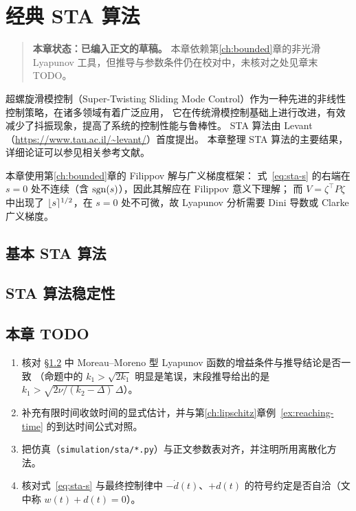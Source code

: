 \chapter{经典 STA 算法}\label{ch:sta}

\begin{quote}
\textbf{本章状态：已编入正文的草稿。}
本章依赖第\ref{ch:bounded}章的非光滑 Lyapunov 工具，但推导与参数条件仍在校对中，未核对之处见章末 TODO。
\end{quote}

超螺旋滑模控制（Super-Twisting Sliding Mode Control）作为一种先进的非线性控制策略，在诸多领域有着广泛应用，
它在传统滑模控制基础上进行改进，有效减少了抖振现象，提高了系统的控制性能与鲁棒性。
STA 算法由 Levant（\url{https://www.tau.ac.il/~levant/}）首度提出。
本章整理 STA 算法的主要结果，详细论证可以参见相关参考文献。

本章使用第\ref{ch:bounded}章的 Filippov 解与广义梯度框架：
式~\eqref{eq:sta-s} 的右端在 $s=0$ 处不连续（含 $\operatorname{sgn}(s)$），因此其解应在 Filippov 意义下理解；
而 $V=\zeta^\top P\zeta$ 中出现了 $\lfloor s \rceil^{1/2}$，在 $s=0$ 处不可微，故 Lyapunov 分析需要 Dini 导数或 Clarke 广义梯度。

\section{基本 STA 算法}

\section{STA 算法稳定性}\label{sec:sta-stability}


\section*{本章 TODO}
\begin{enumerate}
  \item 核对 \S\ref{sec:sta-stability} 中 Moreau--Moreno 型 Lyapunov 函数的增益条件与推导结论是否一致
        （命题中的 $k_1>\sqrt{2k_1}$ 明显是笔误，末段推导给出的是 $k_1>\sqrt{2\nu/(k_2-\Delta)}\,\Delta$）。
  \item 补充有限时间收敛时间的显式估计，并与第\ref{ch:lipschitz}章例~\ref{ex:reaching-time} 的到达时间公式对照。
  \item 把仿真（\texttt{simulation/sta/*.py}）与正文参数表对齐，并注明所用离散化方法。
  \item 核对式~\eqref{eq:sta-s} 与最终控制律中 $-\dot d(t)$、$+d(t)$ 的符号约定是否自洽（文中称 $w(t)+d(t)=0$）。
\end{enumerate}

